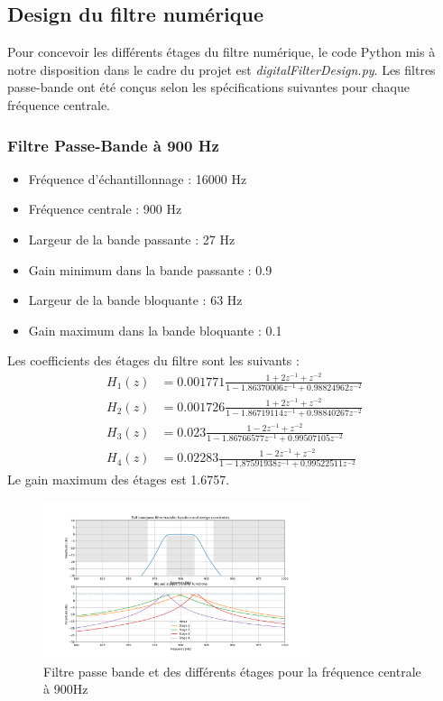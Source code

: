 \subsection{Design du filtre numérique}
Pour concevoir les différents étages du filtre numérique, le code Python mis à notre disposition dans le cadre du projet est \textit{digitalFilterDesign.py}. Les filtres passe-bande ont été conçus selon les spécifications suivantes pour chaque fréquence centrale.

\subsubsection{Filtre Passe-Bande à 900 Hz}
\begin{itemize}
\item Fréquence d'échantillonnage : 16000 Hz
\item Fréquence centrale : 900 Hz
\item Largeur de la bande passante : 27 Hz
\item Gain minimum dans la bande passante : 0.9
\item Largeur de la bande bloquante : 63 Hz
\item Gain maximum dans la bande bloquante : 0.1
\end{itemize}

Les coefficients des étages du filtre sont les suivants :
\begin{align*}
    H_1(z) &= 0.001771 \frac{1+2z^{-1}+z^{-2}}{1-1.86370006z^{-1}+0.98824962z^{-2}} \\
    H_2(z) &= 0.001726 \frac{1+2z^{-1}+z^{-2}}{1-1.86719114z^{-1}+0.98840267z^{-2}} \\
    H_3(z) &= 0.023 \frac{1-2z^{-1}+z^{-2}}{1-1.86766577z^{-1}+0.99507105z^{-2}} \\
    H_4(z) &= 0.02283 \frac{1-2z^{-1}+z^{-2}}{1 -1.87591938z^{-1}+ 0.99522511z^{-2}}
\end{align*}
Le gain maximum des étages est 1.6757.

\begin{figure}[H]
    \centering
    \includegraphics[width=0.7\textwidth]{Pictures/filtre iir 900.png}
    \caption{Filtre passe bande et des différents étages pour la fréquence centrale à 900Hz}
    \label{fig:enter-label}
\end{figure}

